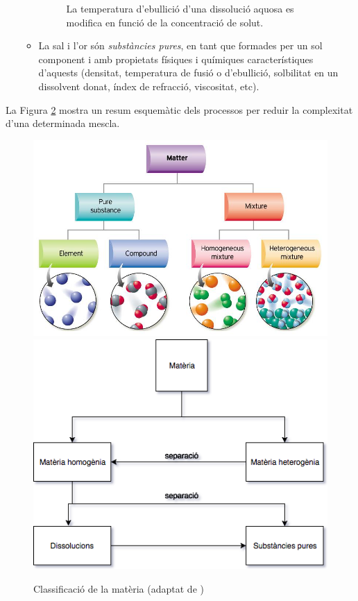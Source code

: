 \begin{itemize}
\begin{itemize}
\begin{figure}[h]
\caption{La temperatura d'ebullició d'una dissolució aquosa es modifica en funció de la concentració de solut.}
\label{fig:watsuc2}
\end{figure}
\item La sal i l'or són \emph{substàncies pures}, en tant que formades per un sol component i amb propietats físiques i químiques característiques d'aquests (densitat, temperatura de fusió o d'ebullició, solbilitat en un dissolvent donat, índex de refracció, viscositat, etc).
\end{itemize}
\end{itemize}


La Figura \ref{fig:SeparacioMescles} mostra un resum esquemàtic dels processos per reduir la complexitat d'una determinada mescla.

\begin{figure}[h]
\centering
\includegraphics[scale=0.35]{figures/Mixtures.png}
\includegraphics[scale=0.50]{figures/SeparacioMescles.png}
\caption{Classificació de la matèria (adaptat de \cite{Caamano1984})}
\label{fig:SeparacioMescles}
\end{figure}

